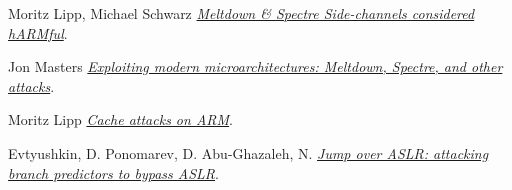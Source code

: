 \begin{frame}[allowframebreaks]
\begin{thebibliography}{10}
    Moritz Lipp, Michael Schwarz
    \newblock \href{https://mlq.me/download/qmss2018_slides.pdf}{\em Meltdown \& Spectre Side-channels considered hARMful}.

    Jon Masters
    \newblock \href{http://people.redhat.com/jcm/talks/FOSDEM_2018.pdf}{\em Exploiting modern microarchitectures: Meltdown,
      Spectre, and other attacks}.

    Moritz Lipp
    \newblock
    \href{https://www.blackhat.com/docs/eu-16/materials/eu-16-Lipp-ARMageddon-How-Your-Smartphone-CPU-Breaks-Software-Level-Security-And-Privacy-wp.pdf}{\em
      Cache attacks on ARM}.

    Evtyushkin, D. Ponomarev, D. Abu-Ghazaleh, N.
    \newblock
    \href{https://dl.acm.org/citation.cfm?id=3195638.3195686}{\em Jump over ASLR: attacking branch predictors to bypass ASLR}.

  \end{thebibliography}
\end{frame}